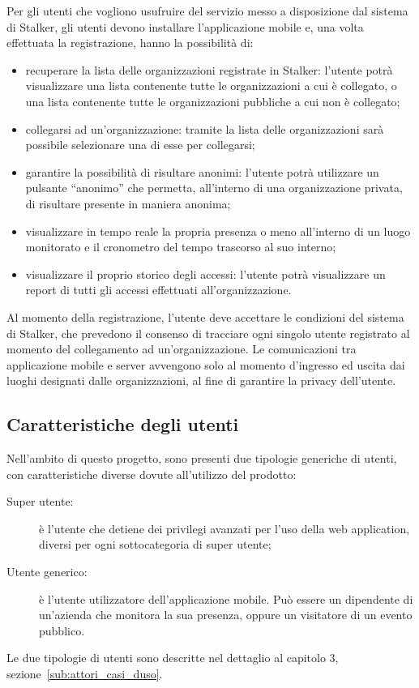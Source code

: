 \documentclass[../analisi-dei-requisiti.tex]{subfiles}
\begin{document}
Per gli utenti che vogliono usufruire del servizio messo a disposizione dal sistema di Stalker, gli utenti devono installare l'applicazione mobile
e, una volta effettuata la registrazione, hanno la possibilità di:
\begin{itemize}
  \item recuperare la lista delle organizzazioni registrate in Stalker: l'utente potrà visualizzare una lista contenente tutte le organizzazioni a cui è collegato, o una lista contenente tutte
  le organizzazioni pubbliche a cui non è collegato;
  \item collegarsi ad un'organizzazione: tramite la lista delle organizzazioni sarà possibile selezionare una di esse per collegarsi;
  \item garantire la possibilità di risultare anonimi: l'utente potrà utilizzare un pulsante “anonimo” che permetta, all’interno di una organizzazione privata, di risultare presente in maniera anonima;
  \item visualizzare in tempo reale la propria presenza o meno all’interno di un luogo monitorato e il cronometro del tempo trascorso al suo interno;
  \item visualizzare il proprio storico degli accessi: l'utente potrà visualizzare un report di tutti gli accessi effettuati all'organizzazione.

\end{itemize}
Al momento della registrazione, l'utente deve accettare le condizioni del sistema di Stalker, che prevedono il consenso di tracciare
ogni singolo utente registrato al momento del collegamento ad un'organizzazione.
Le comunicazioni tra applicazione mobile e server avvengono solo al momento d'ingresso ed uscita dai luoghi designati dalle organizzazioni, al fine di garantire
la privacy dell'utente.



\subsection{Caratteristiche degli utenti}%
\label{sub:caratteristiche_degli_utenti}
Nell'ambito di questo progetto, sono presenti due tipologie generiche di utenti, con caratteristiche diverse dovute all'utilizzo del prodotto:
\begin{description}
  \item[Super utente:] è l'utente che detiene dei privilegi avanzati per l'uso della web application, diversi per ogni sottocategoria di super utente;
  \item[Utente generico:] è l'utente utilizzatore dell'applicazione mobile. Può essere un dipendente di un'azienda che monitora la sua presenza, oppure
        un visitatore di un evento pubblico.
\end{description}
Le due tipologie di utenti sono descritte nel dettaglio al capitolo 3, sezione~\ref{sub:attori_casi_duso}.
\end{document}
